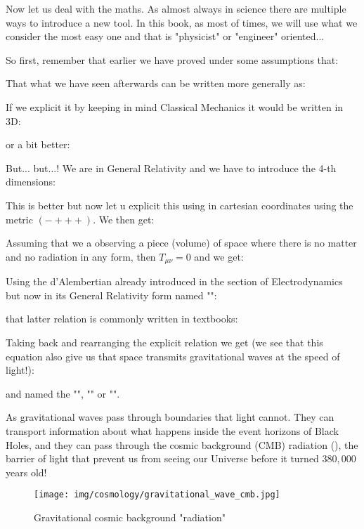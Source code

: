 	
	Now let us deal with the maths. As almost always in science there are multiple ways to introduce a new tool. In this book, as most of times, we will use what we consider the most easy one and that is "physicist" or "engineer" oriented...
	
	So first, remember that earlier we have proved under some assumptions that:
	
	That what we have seen afterwards can be written more generally as:
	
	If we explicit it by keeping in mind Classical Mechanics it would be written in 3D:
	
	or a bit better:
	
	But... but...! We are in General Relativity and we have to introduce the 4-th dimensions:
	
	This is better but now let u explicit this using in cartesian coordinates using the metric $(- + + +)$. We then get:
	
	Assuming that we a observing a piece (volume) of space where there is no matter and no radiation in any form, then $T_{\mu\nu}=0$ and we get:
	
	Using the d'Alembertian already introduced in the section of Electrodynamics but now in its General Relativity form named "":
	
	that latter relation is commonly written in textbooks:
	
	Taking back and rearranging the explicit relation we get (we see that this equation also give us that space transmits gravitational waves at the speed of light!):
	
	and named the "", "" or "".
	
	As gravitational waves pass through boundaries that light cannot. They can transport information about what happens inside the event horizons of Black Holes, and they can pass through the cosmic background (CMB) radiation (), the barrier of light that prevent us from seeing our Universe before it turned $380,000$ years old!
	\begin{figure}[H]
		\centering
		\texttt{[image: img/cosmology/gravitational\_wave\_cmb.jpg]}	
		\caption{Gravitational cosmic background "radiation"}
	\end{figure}
	
